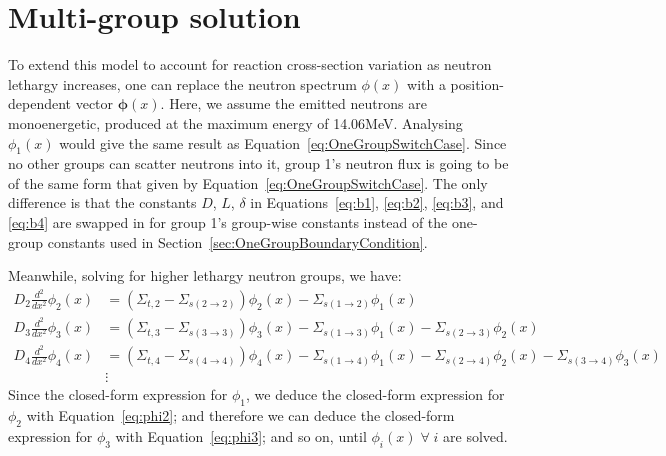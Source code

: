 \documentclass[a4paper, 12pt]{article}
\newcommand{\ve}[1]{\boldsymbol{#1}}
\begin{document}
\section{Multi-group solution}
To extend this model to account for reaction cross-section variation as neutron lethargy increases, one can replace the neutron spectrum $\phi(x)$ with a position-dependent vector $\ve{\phi}(x)$.
Here, we assume the emitted neutrons are monoenergetic, produced at the maximum energy of 14.06MeV.
Analysing $\phi_1(x)$ would give the same result as Equation~\ref{eq:OneGroupSwitchCase}.
Since no other groups can scatter neutrons into it, group 1's neutron flux is going to be of the same form that given by Equation~\ref{eq:OneGroupSwitchCase}. The only difference is that the constants $D$, $L$, $\delta$ in Equations~\ref{eq:b1}, \ref{eq:b2}, \ref{eq:b3}, and \ref{eq:b4} are swapped in for group 1's group-wise constants instead of the one-group constants used in Section~\ref{sec:OneGroupBoundaryCondition}.

Meanwhile, solving for higher lethargy neutron groups, we have:
\begin{align}
    D_2 \frac{d^2}{dx^2}\phi_2(x) &= (\Sigma_{t,2} - \Sigma_{s(2\rightarrow 2)}) \phi_2(x) - \Sigma_{s(1\rightarrow 2)} \phi_1(x)\label{eq:phi2}\\
    D_3 \frac{d^2}{dx^2}\phi_3(x) &= (\Sigma_{t,3} - \Sigma_{s(3\rightarrow 3)}) \phi_3(x) - \Sigma_{s(1\rightarrow 3)} \phi_1(x) - \Sigma_{s(2\rightarrow 3)} \phi_2(x)\label{eq:phi3}\\
    D_4 \frac{d^2}{dx^2}\phi_4(x) &= (\Sigma_{t,4} - \Sigma_{s(4\rightarrow 4)}) \phi_4(x) - \Sigma_{s(1\rightarrow 4)} \phi_1(x) - \Sigma_{s(2\rightarrow 4)} \phi_2(x) - \Sigma_{s(3\rightarrow 4)} \phi_3(x)\label{eq:phi4}\\
    &\vdots \nonumber
\end{align}
Since the closed-form expression for $\phi_1$, we deduce the closed-form expression for $\phi_2$ with Equation~\ref{eq:phi2}; and therefore we can deduce the closed-form expression for $\phi_3$ with Equation~\ref{eq:phi3}; and so on, until $\phi_i(x)\; \forall\; i$  are solved.
\end{document}

